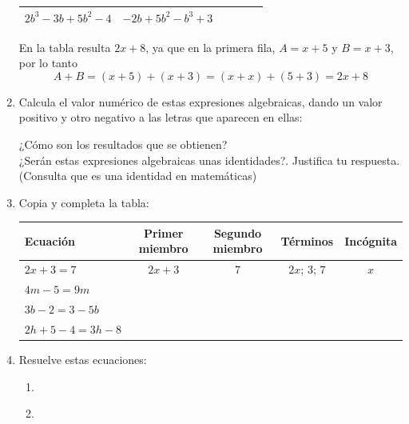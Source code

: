 \documentclass[10pt,twoside]{article}
\begin{document}
\begin{enumerate}
\begin{center}
\begin{tabular}{|l|l|c|c|c|c|}
\hline 
$2b^{3}-3b+5b^{2}-4$ & $-2b+5b^{2}-b^{3}+3$ &  &  &  &  \\ 
\hline 
\end{tabular} 
\end{center}
En la tabla resulta $2x+8$, ya que en la primera fila, $A=x+5$ y $B=x+3$, por lo tanto \[A+B=(x+5)+(x+3)=(x+x)+(5+3)=2x+8\]
\item Calcula el valor numérico de estas expresiones algebraicas, dando un valor positivo y otro negativo a las letras que aparecen en ellas:
\begin{enumerate}
\end{enumerate}
¿Cómo son los resultados que se obtienen?\\
¿Serán estas expresiones algebraicas unas identidades?. Justifica tu respuesta. (Consulta que es una identidad en matemáticas)
\item Copia y completa la tabla:
\begin{center}
\begin{tabular}{|l|c|c|c|c|}
\hline 
\hspace*{0.5cm} Ecuación & Primer miembro & Segundo miembro & Términos & Incógnita \\ 
\hline 
$2x+3=7$ & $2x+3$ & 7 & $2x$; \quad $3$; \quad $7$& $x$  \\ 
\hline 
$4m-5=9m$ &  &  &  &  \\ 
\hline 
$3b-2=3-5b$ &  &  &  &  \\ 
\hline 
$2h+5-4=3h-8$ &  &  &  &  \\ 
\hline 
\end{tabular} 
\end{center}
\item Resuelve estas ecuaciones:
\begin{enumerate}
\item 
\begin{enumerate}
\end{enumerate}
\item
\begin{enumerate}
\end{enumerate}
\end{enumerate}

\end{enumerate}
\end{document}
